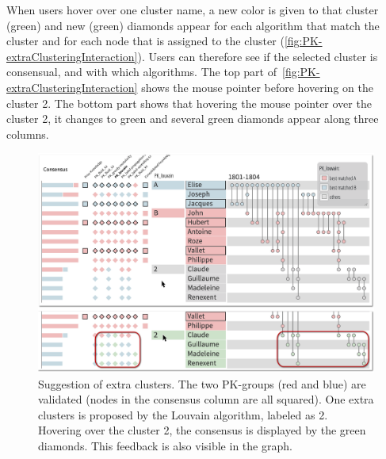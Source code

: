 When users hover over one cluster name, a new color is given to that cluster (\eg green) and new (green) diamonds appear for each algorithm that match the cluster and for each node that is assigned to the cluster (\autoref{fig:PK-extraClusteringInteraction}).
Users can therefore see if the selected cluster is consensual, and with which algorithms. The top part of~\autoref{fig:PK-extraClusteringInteraction} shows the mouse pointer before hovering on the cluster 2. The bottom part shows that hovering the mouse pointer over the cluster 2, it changes to green and several green diamonds appear along three columns.


\begin{figure}[!ht]
\centering
\includegraphics[width=\linewidth]{static/figures/PK-Clustering/VISPaperFigures/Small-extraClusters-01.png}
\caption{Suggestion of extra clusters. The two PK-groups (red and blue) are validated (nodes in the consensus column are all squared). One extra clusters is proposed by the Louvain algorithm, labeled as 2. Hovering over the cluster 2, the consensus is displayed by the green diamonds. This feedback is also visible in the graph.}
\label{fig:PK-extraClusteringInteraction}
\end{figure}


